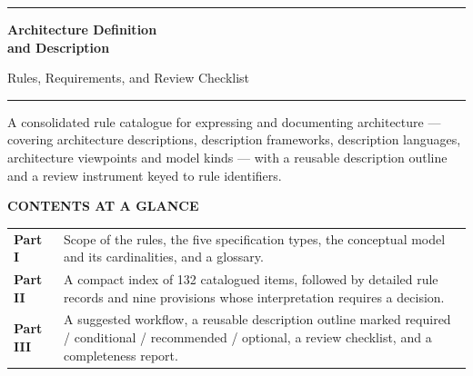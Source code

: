 \documentclass[11pt,a4paper]{report}
\begin{document}
\hypersetup{pageanchor=false}%
\begin{titlepage}
\thispagestyle{empty}
\vspace*{22mm}
{\color{rulegrey}\hrule height 1pt}
\vspace{9mm}

{\sffamily\bfseries\fontsize{27}{32}\selectfont\color{navy}
Architecture Definition\\[2pt] and Description\par}

\vspace{5mm}
{\sffamily\fontsize{15}{19}\selectfont\color{steel}
Rules, Requirements, and Review Checklist\par}

\vspace{7mm}
{\color{rulegrey}\hrule height 0.6pt}
\vspace{9mm}

{\sffamily\normalsize\color{slate}
A consolidated rule catalogue for expressing and documenting architecture ---
covering architecture descriptions, description frameworks, description languages,
architecture viewpoints and model kinds --- with a reusable description outline
and a review instrument keyed to rule identifiers.\par}

\vspace{10mm}

{\sffamily\footnotesize\bfseries\color{steel}CONTENTS AT A GLANCE\par}
\vspace{2mm}
{\small
\begin{tabular}{@{}L{34mm} L{96mm}@{}}
\toprule
\textbf{Part I} & Scope of the rules, the five specification types, the
                  conceptual model and its cardinalities, and a glossary. \\
\addlinespace
\textbf{Part II} & A compact index of 132 catalogued items, followed by detailed
                   rule records and nine provisions whose interpretation
                   requires a decision. \\
\addlinespace
\textbf{Part III} & A suggested workflow, a reusable description outline marked
                    required / conditional / recommended / optional, a review
                    checklist, and a completeness report. \\
\bottomrule
\end{tabular}}

\vfill


\end{titlepage}
\end{document}
